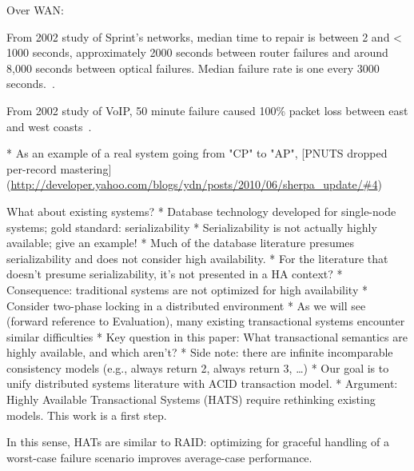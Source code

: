 Over WAN: 

From 2002 study of Sprint's networks, median time to repair is between 2 and < 1000 seconds, approximately 2000 seconds between router failures and around 8,000 seconds between optical failures. Median failure rate is one every 3000 seconds.~\cite{ip-backbone-failures}.

From 2002 study of VoIP, 50 minute failure caused 100\% packet loss between east and west coasts~\cite{voip-partitions}.

* As an example of a real system going from "CP" to "AP", [PNUTS dropped per-record mastering](\url{http://developer.yahoo.com/blogs/ydn/posts/2010/06/sherpa_update/#4})

What about existing systems?
* Database technology developed for single-node systems; gold standard: serializability
	* Serializability is not actually highly available; give an example!
	* Much of the database literature presumes serializability and does not consider high availability.
	* For the literature that doesn't presume serializability, it's not presented in a HA context?
* Consequence: traditional systems are not optimized for high availability
	* Consider two-phase locking in a distributed environment
	* As we will see (forward reference to Evaluation), many existing transactional systems encounter similar difficulties
* Key question in this paper: What transactional semantics are highly available, and which aren't?
	* Side note: there are infinite incomparable consistency models (e.g., always return 2, always return 3, …)
	* Our goal is to unify distributed systems literature with ACID transaction model.
* Argument: Highly Available Transactional Systems (HATS) require rethinking existing models. This work is a first step.

In this sense, HATs are similar to RAID: optimizing for graceful
handling of a worst-case failure scenario improves average-case
performance.

